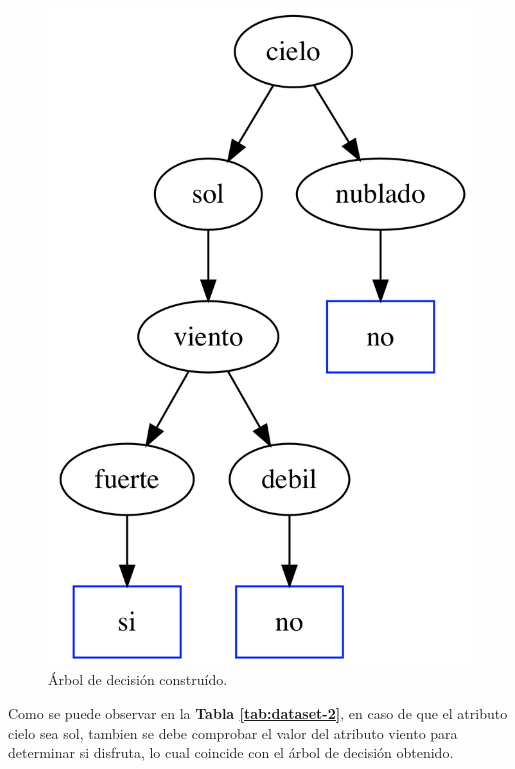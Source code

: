\documentclass[a4paper]{article}
\newcommand{\reftable}[1]{\textbf{Tabla \ref{#1}}}
\begin{document}
\begin{figure}[h]
  \centering
    \includegraphics[scale=0.4]{img/tree2.png}
  \caption{Árbol de decisión construído.}
  \label{ej1-tree2}
\end{figure}

Como se puede observar en la \reftable{tab:dataset-2}, en caso de que el atributo cielo sea sol, tambien se debe comprobar el valor del atributo viento para determinar si disfruta, lo cual coincide con el árbol de decisión obtenido.
\end{document}
